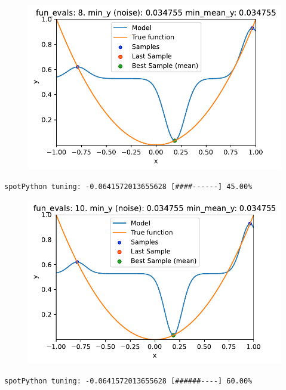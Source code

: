 \documentclass[
  letterpaper,
  DIV=11,
  numbers=noendperiod]{scrreprt}
\begin{document}
\begin{figure}[H]

{\centering \includegraphics{014_num_spot_ocba_files/figure-pdf/cell-6-output-2.pdf}

}

\end{figure}

\begin{verbatim}
spotPython tuning: -0.0641572013655628 [####------] 45.00% 
\end{verbatim}

\begin{figure}[H]

{\centering \includegraphics{014_num_spot_ocba_files/figure-pdf/cell-6-output-4.pdf}

}

\end{figure}

\begin{verbatim}
spotPython tuning: -0.0641572013655628 [######----] 60.00% 
\end{verbatim}
\end{document}
